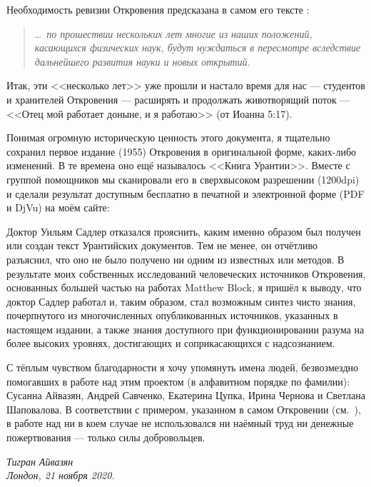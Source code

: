 Необходимость ревизии Откровения предсказана в самом его тексте :
\begin{quote}
\ldots\itshape\ по прошествии нескольких лет многие из наших положений, касающихся физических наук, будут нуждаться в пересмотре вследствие дальнейшего развития науки и новых открытий.
\end{quote}
Итак, эти <<несколько лет>> уже прошли и настало время для нас --- студентов и хранителей Откровения --- расширять и
продолжать животворящий поток  --- <<Отец мой работает доныне, и я работаю>> (от Иоанна 5:17).

Понимая огромную историческую ценность этого документа,
я тщательно сохранил первое издание (1955) Откровения в оригинальной форме,  каких-либо изменений.
В те времена оно ещё называлось <<Книга Урантии>>.
Вместе с группой помощников мы сканировали его в сверхвысоком разрешении (1200dpi) и сделали результат доступным бесплатно
в печатной и электронной форме (PDF и DjVu) на моём сайте:

\begin{center}
\end{center}

Доктор Уильям Садлер отказался прояснить, каким именно образом был получен или создан текст Урантийских документов.
Тем не менее, он отчётливо разъяснил, что оно не было получено ни одним из известных
 или  методов.
В результате моих собственных исследований человеческих источников Откровения, основанных большей частью
на работах Matthew Block, я пришёл к выводу, что доктор Садлер работал
 и, таким образом, стал возможным синтез чисто  знания,
почерпнутого из многочисленных опубликованных источников, указанных в настоящем издании,
а также знания 
доступного при функционировании разума на более высоких уровнях, достигающих и соприкасающихся с надсознанием.

С тёплым чувством благодарности я хочу упомянуть имена людей, безвозмездно помогавших в работе над этим проектом
(в алфавитном порядке по фамилии): Сусанна Айвазян, Андрей Савченко, Екатерина Цупка, Ирина Чернова и Светлана Шаповалова.
В соответствии с примером, указанном в самом Откровении (см.~), в работе над
 ни в коем случае не использовался ни наёмный труд ни денежные пожертвования --- только
силы добровольцев.


\begin{flushleft}
\itshape
Тигран Айвазян\\
Лондон, 21 ноября 2020.\\
\end{flushleft}
